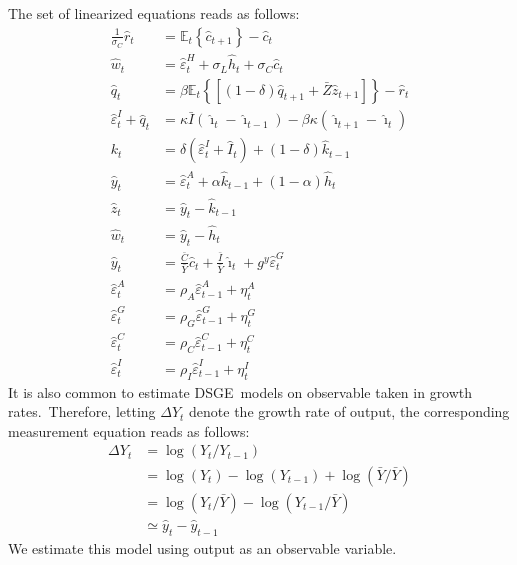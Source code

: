 \documentclass[a4paper,12pt]{article}%
\begin{document}
The set of linearized equations reads as follows:%
\begin{align*}
\frac{1}{\sigma_{C}}\hat{r}_{t} &  =\mathbb{E}_{t}\left\{  \hat{c}%
_{t+1}\right\}  -\hat{c}_{t}\\
\hat{w}_{t} &  =\hat{\varepsilon}_{t}^{H}+\sigma_{L}\hat{h}_{t}+\sigma_{C}%
\hat{c}_{t}\\
\hat{q}_{t} &  =\beta\mathbb{E}_{t}\left\{  \left[  \overset{}{\left(
1-\delta\right)  }\hat{q}_{t+1}+\bar{Z}\hat{z}_{t+1}\right]  \right\}
-\hat{r}_{t}\\
\hat{\varepsilon}_{t}^{I}+\hat{q}_{t} &  =\kappa\bar{I}\left(  \hat{\imath
}_{t}-\hat{\imath}_{t-1}\right)  -\beta\kappa\left(  \hat{\imath}_{t+1}%
-\hat{\imath}_{t}\right)  \\
k_{t} &  =\delta\left(  \hat{\varepsilon}_{t}^{I}+\hat{I}_{t}\right)  +\left(
1-\delta\right)  \hat{k}_{t-1}\\
\hat{y}_{t} &  =\hat{\varepsilon}_{t}^{A}+\alpha\hat{k}_{t-1}{}+\left(
1-\alpha\right)  \hat{h}_{t}{}\\
\hat{z}_{t} &  =\hat{y}_{t}-\hat{k}_{t-1}\\
\hat{w}_{t} &  =\hat{y}_{t}-\hat{h}_{t}\\
\hat{y}_{t} &  =\frac{\bar{C}}{\bar{Y}}\hat{c}_{t}+\frac{\bar{I}}{\bar{Y}}%
\hat{\imath}_{t}+g^{y}\hat{\varepsilon}_{t}^{G}\\
\hat{\varepsilon}_{t}^{A} &  =\rho_{A}\hat{\varepsilon}_{t-1}^{A}+\eta_{t}%
^{A}\\
\hat{\varepsilon}_{t}^{G} &  =\rho_{G}\hat{\varepsilon}_{t-1}^{G}+\eta_{t}%
^{G}\\
\hat{\varepsilon}_{t}^{C} &  =\rho_{C}\hat{\varepsilon}_{t-1}^{C}+\eta_{t}%
^{C}\\
\hat{\varepsilon}_{t}^{I} &  =\rho_{I}\hat{\varepsilon}_{t-1}^{I}+\eta_{t}^{I}%
\end{align*}
It is also common to estimate DSGE\ models on observable taken in growth
rates.\ Therefore, letting $\Delta Y_{t}$ denote the growth rate of output,
the corresponding measurement equation reads as follows:%
\begin{align*}
\Delta Y_{t} &  =\log(Y_{t}/Y_{t-1})\\
&  =\log(Y_{t})-\log(Y_{t-1})+\log(\bar{Y}/\bar{Y})\\
&  =\log(Y_{t}/\bar{Y})-\log(Y_{t-1}/\bar{Y})\\
&  \simeq\hat{y}_{t}-\hat{y}_{t-1}%
\end{align*}
We estimate this model using output as an observable variable.
\end{document}
